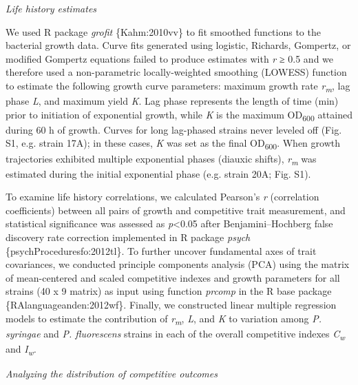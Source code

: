 \emph{Life history estimates}

We used R package \emph{grofit} \{Kahm:2010vv\} to fit smoothed
functions to the bacterial growth data. Curve fits generated using
logistic, Richards, Gompertz, or modified Gompertz equations failed to
produce estimates with \emph{r} ≥ 0.5 and we therefore used a
non-parametric locally-weighted smoothing (LOWESS) function to estimate
the following growth curve parameters: maximum growth rate
\emph{r\textsubscript{m}}, lag phase \emph{L}, and maximum yield
\emph{K}. Lag phase represents the length of time (min) prior to
initiation of exponential growth, while \emph{K} is the maximum
OD\textsubscript{600} attained during 60 h of growth. Curves for long
lag-phased strains never leveled off (Fig. S1, e.g. strain 17A); in
these cases, \emph{K} was set as the final OD\textsubscript{600}. When
growth trajectories exhibited multiple exponential phases (diauxic
shifts), \emph{r\textsubscript{m}} was estimated during the initial
exponential phase (e.g. strain 20A; Fig. S1).

To examine life history correlations, we calculated Pearson's \emph{r}
(correlation coefficients) between all pairs of growth and competitive
trait measurement, and statistical significance was assessed as
\emph{p}\textless{}0.05 after Benjamini--Hochberg false discovery rate
correction implemented in R package \emph{psych}
\{psychProceduresfo:2012tl\}. To further uncover fundamental axes of
trait covariances, we conducted principle components analysis (PCA)
using the matrix of mean-centered and scaled competitive indexes and
growth parameters for all strains (40 x 9 matrix) as input using
function \emph{prcomp} in the R base package \{RAlanguageanden:2012wf\}.
Finally, we constructed linear multiple regression models to estimate
the contribution of \emph{r\textsubscript{m}}, \emph{L}, and \emph{K} to
variation among \emph{P. syringae} and \emph{P. fluorescens} strains in
each of the overall competitive indexes \emph{C\textsubscript{w}} and
\emph{I\textsubscript{w}.}

\emph{Analyzing the distribution of competitive outcomes}

